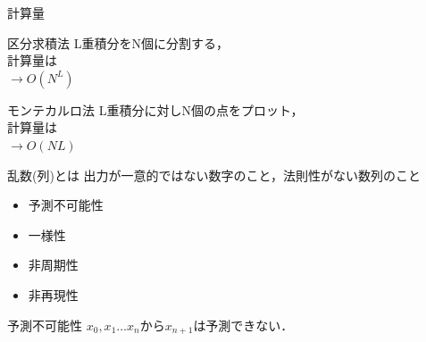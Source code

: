 \documentclass[dvipdfmx,xcolor={svgnames},notes=only]{beamer}
\begin{document}
  \begin{frame}{計算量}
    \begin{block}{区分求積法}
      L重積分をN個に分割する，\\ 計算量は \\
      $\rightarrow O(N^L)$
    \end{block}
    \begin{block}{モンテカルロ法}
      L重積分に対しN個の点をプロット，\\ 計算量は \\
      $\rightarrow O(NL)$
    \end{block}
  \end{frame}

  \begin{frame}{乱数(列)とは}
    出力が一意的ではない数字のこと，法則性がない数列のこと
    \begin{itemize}
      \item 予測不可能性
      \item 一様性
      \item 非周期性
      \item 非再現性
    \end{itemize}
  \end{frame}

  \begin{frame}{予測不可能性}
    $x_0,x_1\ldots x_n$から$x_{n+1}$は予測できない．
  \end{frame}
\end{document}
